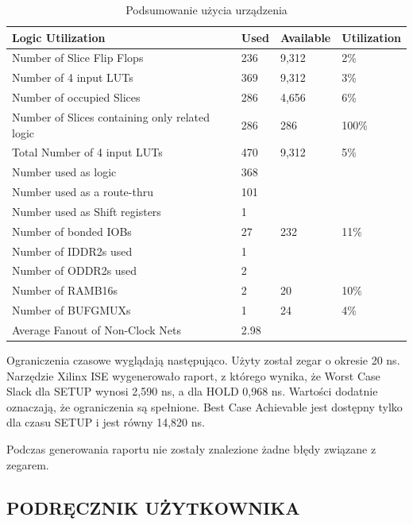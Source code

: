 \documentclass[11pt]{article}
\begin{document}
\begin{table}[H]
\caption{Podsumowanie użycia urządzenia}
\begin{tabular}{|l|l|l|l|}
\hline
Logic Utilization &
Used &
Available &
Utilization \\
\hline
Number of Slice Flip Flops &
236 &
9,312 &
2\% \\
\hline
Number of 4 input LUTs &
369 &
9,312 &
3\% \\
\hline
Number of occupied Slices &
286 &
4,656 & 
6\% \\
\hline
Number of Slices containing only related logic &
286 &
286 &
100\% \\
\hline

Total Number of 4 input LUTs &
470 &
9,312 &
5\% \\
\hline
Number used as logic &
368 & & \\
\hline
 
Number used as a route-thru &
101 & & \\
\hline
 
Number used as Shift registers &
1 & & \\
\hline
 
Number of bonded IOBs &
27 &
232 &
11\% \\
\hline
Number of IDDR2s used &
1 & & \\
\hline 
 
Number of ODDR2s used &
2 & & \\
\hline
 
 
Number of RAMB16s &
2 &
20 &
10\% \\
\hline
Number of BUFGMUXs &
1 &
24 &
4\% \\
\hline
Average Fanout of Non-Clock Nets &
2.98 & & \\
\hline
\end{tabular}

\end{table}

\vspace{1em}

Ograniczenia czasowe wyglądają następująco.
Użyty został zegar o okresie 20 ns.
Narzędzie Xilinx ISE wygenerowało raport, z którego wynika, że Worst Case Slack dla SETUP wynosi 2,590 ns, a dla HOLD 0,968 ns.
Wartości dodatnie oznaczają, że ograniczenia są spełnione.
Best Case Achievable jest dostępny tylko dla czasu SETUP i jest równy 14,820 ns.

Podczas generowania raportu nie zostały znalezione żadne błędy związane z zegarem.

\subsection{PODRĘCZNIK UŻYTKOWNIKA}
\end{document}
